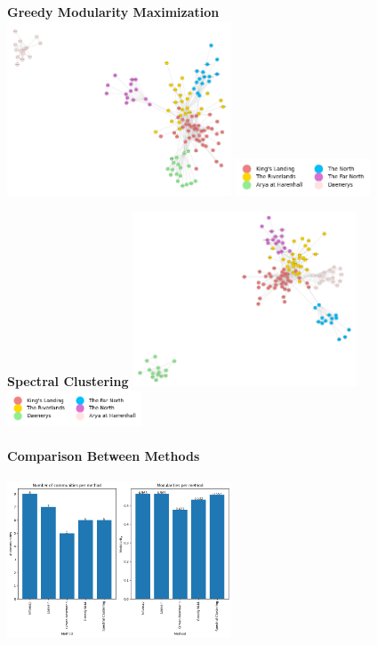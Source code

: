 \documentclass[10pt,twocolumn,letterpaper]{article}
\begin{document}
\begin{center}
    \textbf{Greedy Modularity Maximization}\\
    \includegraphics[width=0.5\textwidth]{img/s2/communities_gmm.jpg}
    \includegraphics[width=0.3\textwidth]{img/s2/gmm_legend.jpg}\\
    \caption{\small{$\#communities=6$, $modularity=0.532$}}
\end{center}

\begin{center}
    \textbf{Spectral Clustering}
    \includegraphics[width=0.5\textwidth]{img/s2/communities_sc.jpg}
    \includegraphics[width=0.3\textwidth]{img/s2/sc_legend.jpg}\\
    \caption{\small{$\#communities=10$, $modularity=0.639$}}
\end{center}




\paragraph{Comparison Between Methods}

\begin{center}
    \includegraphics[width=0.5\textwidth]{img/s2/communities_comparison.jpg}
\end{center}
\end{document}
